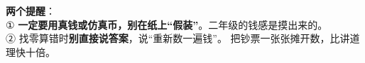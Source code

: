 \begin{tipbox}
\textbf{两个提醒}：\\
① \textbf{一定要用真钱或仿真币，别在纸上“假装”}。二年级的钱感是摸出来的。\\
② 找零算错时\textbf{别直接说答案}，说“重新数一遍钱”。
把钞票一张张摊开数，比讲道理快十倍。
\end{tipbox}
